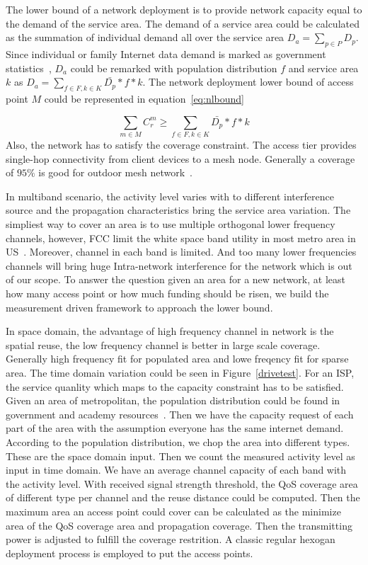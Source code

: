 The lower bound of a network deployment is to provide network capacity equal to the demand of the service 
area. The demand of a service area could be calculated as the summation of individual demand all over 
the service area $D_a=\sum_{p\in P}D_p$. Since individual or family Internet data demand is marked as government 
statistics~\cite{rosston2011household}, $D_a$ could be remarked with population distribution $f$ and service area $k$ as 
$D_a=\sum_{f \in F,k \in K}\bar{D_p}*f*k$. The network deployment lower bound of access point $M$ could be 
represented in equation~\ref{eq:nlbound}

\begin{equation}
\label{eq:nlbound}
\sum_{m \in M}C_r^m \ge \sum_{f \in F,k \in K}\bar{D_p}*f*k
\end{equation}
Also, the network has to satisfy the coverage constraint. The access tier provides 
single-hop connectivity from client devices to a mesh node. 
Generally a coverage of $95\%$ is good for outdoor mesh network~\cite{robinson2010deploying}.

In multiband scenario, the activity level varies with to different interference source and the propagation
 characteristics bring the service area variation. The simpliest way to cover an area is to use 
 multiple orthogonal lower frequency channels, however, FCC limit the white space band utility in 
 most metro area in US~\cite{googledatabase}. Moreover, channel in each band is limited. 
 And too many lower frequencies channels will bring  huge Intra-network interference for 
 the network which is out of our scope. To answer the question given an area for a new network, 
 at least how many access point or how much funding should be risen, we build the measurement driven
  framework to approach the lower bound.




In space domain, the advantage of high frequency channel in network is the spatial reuse, the low
frequency channel is better in large scale coverage. Generally high frequency fit
for populated area and lowe freqency fit for sparse area.
The time domain variation could be seen in Figure~\ref{drivetest}.
For an ISP, the service quanlity which maps to the capacity constraint has to be satisfied.
Given an area of metropolitan, the population distribution could be found in 
government and academy resources~\cite{uscensus}. Then we have the capacity request
of each part of the area with the assumption everyone has the same internet demand. 
According to the population distribution, we chop the area into different types.
These are the space domain input. Then we count the measured activity level as 
input in time domain. We have an average channel capacity of each band with the 
activity level. With received signal strength threshold, 
the QoS coverage area of different type per channel and the reuse distance could be computed. 
Then the maximum area an access point could cover can be calculated as the minimize 
area of the QoS coverage area and propagation coverage.
Then the transmitting power is adjusted to fulfill the coverage restrition. 
A classic regular hexogan deployment process is employed to put the access points.


